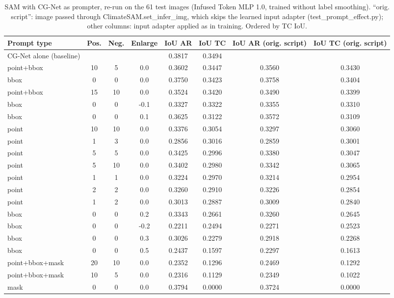 \begin{table}[htbp]
\centering
\small
\begin{adjustbox}{max width=\linewidth}
\begin{tabular}{lccccccc}
\toprule
Prompt type & Pos. & Neg. & Enlarge & IoU AR & IoU TC & IoU AR (orig. script) & IoU TC (orig. script) \\
\midrule
CG-Net alone (baseline) &  &  &  & 0.3817 & 0.3494 &  &  \\
\midrule
point+bbox & 10 & 5 & 0.0 & 0.3602 & 0.3447 & 0.3560 & 0.3430 \\
bbox & 0 & 0 & 0.0 & 0.3750 & 0.3423 & 0.3758 & 0.3404 \\
point+bbox & 15 & 10 & 0.0 & 0.3524 & 0.3420 & 0.3490 & 0.3399 \\
bbox & 0 & 0 & -0.1 & 0.3327 & 0.3322 & 0.3355 & 0.3310 \\
bbox & 0 & 0 & 0.1 & 0.3625 & 0.3122 & 0.3572 & 0.3109 \\
point & 10 & 10 & 0.0 & 0.3376 & 0.3054 & 0.3297 & 0.3060 \\
point & 1 & 3 & 0.0 & 0.2856 & 0.3016 & 0.2859 & 0.3001 \\
point & 5 & 5 & 0.0 & 0.3425 & 0.2996 & 0.3380 & 0.3047 \\
point & 5 & 10 & 0.0 & 0.3402 & 0.2980 & 0.3342 & 0.3065 \\
point & 1 & 1 & 0.0 & 0.3224 & 0.2970 & 0.3214 & 0.2954 \\
point & 2 & 2 & 0.0 & 0.3260 & 0.2910 & 0.3226 & 0.2854 \\
point & 1 & 2 & 0.0 & 0.3013 & 0.2887 & 0.3009 & 0.2840 \\
bbox & 0 & 0 & 0.2 & 0.3343 & 0.2661 & 0.3260 & 0.2645 \\
bbox & 0 & 0 & -0.2 & 0.2211 & 0.2494 & 0.2271 & 0.2523 \\
bbox & 0 & 0 & 0.3 & 0.3026 & 0.2279 & 0.2918 & 0.2268 \\
bbox & 0 & 0 & 0.5 & 0.2437 & 0.1597 & 0.2297 & 0.1613 \\
point+bbox+mask & 20 & 10 & 0.0 & 0.2352 & 0.1296 & 0.2469 & 0.1292 \\
point+bbox+mask & 10 & 5 & 0.0 & 0.2316 & 0.1129 & 0.2349 & 0.1022 \\
mask & 0 & 0 & 0.0 & 0.3794 & 0.0000 & 0.3724 & 0.0000 \\
\bottomrule
\end{tabular}
\end{adjustbox}
\caption{SAM with CG-Net as prompter, re-run on the 61 test images (Infused Token MLP 1.0, trained without label smoothing). ``orig. script'': image passed through ClimateSAM.set\_infer\_img, which skips the learned input adapter (test\_prompt\_effect.py); other columns: input adapter applied as in training. Ordered by TC IoU.}
\label{tab:cgnet_prompter_nosmooth}
\end{table}
